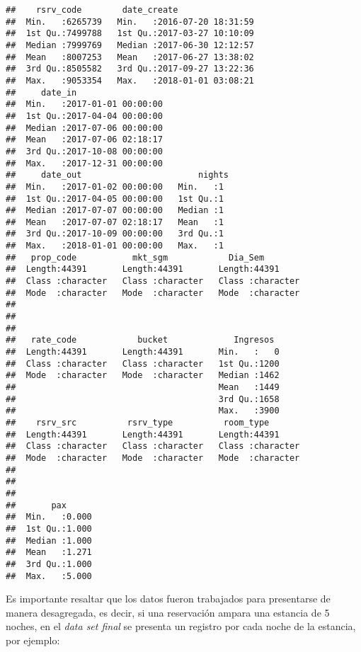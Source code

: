\begin{verbatim}
##    rsrv_code        date_create                 
##  Min.   :6265739   Min.   :2016-07-20 18:31:59  
##  1st Qu.:7499788   1st Qu.:2017-03-27 10:10:09  
##  Median :7999769   Median :2017-06-30 12:12:57  
##  Mean   :8007253   Mean   :2017-06-27 13:38:02  
##  3rd Qu.:8505582   3rd Qu.:2017-09-27 13:22:36  
##  Max.   :9053354   Max.   :2018-01-01 03:08:21  
##     date_in                   
##  Min.   :2017-01-01 00:00:00  
##  1st Qu.:2017-04-04 00:00:00  
##  Median :2017-07-06 00:00:00  
##  Mean   :2017-07-06 02:18:17  
##  3rd Qu.:2017-10-08 00:00:00  
##  Max.   :2017-12-31 00:00:00  
##     date_out                       nights 
##  Min.   :2017-01-02 00:00:00   Min.   :1  
##  1st Qu.:2017-04-05 00:00:00   1st Qu.:1  
##  Median :2017-07-07 00:00:00   Median :1  
##  Mean   :2017-07-07 02:18:17   Mean   :1  
##  3rd Qu.:2017-10-09 00:00:00   3rd Qu.:1  
##  Max.   :2018-01-01 00:00:00   Max.   :1  
##   prop_code           mkt_sgm            Dia_Sem         
##  Length:44391       Length:44391       Length:44391      
##  Class :character   Class :character   Class :character  
##  Mode  :character   Mode  :character   Mode  :character  
##                                                          
##                                                          
##                                                          
##   rate_code            bucket             Ingresos   
##  Length:44391       Length:44391       Min.   :   0  
##  Class :character   Class :character   1st Qu.:1200  
##  Mode  :character   Mode  :character   Median :1462  
##                                        Mean   :1449  
##                                        3rd Qu.:1658  
##                                        Max.   :3900  
##    rsrv_src          rsrv_type          room_type        
##  Length:44391       Length:44391       Length:44391      
##  Class :character   Class :character   Class :character  
##  Mode  :character   Mode  :character   Mode  :character  
##                                                          
##                                                          
##                                                          
##       pax       
##  Min.   :0.000  
##  1st Qu.:1.000  
##  Median :1.000  
##  Mean   :1.271  
##  3rd Qu.:1.000  
##  Max.   :5.000
\end{verbatim}

Es importante resaltar que los datos fueron trabajados para presentarse de manera desagregada, es decir, si una reservación ampara una estancia de 5 noches, en el \emph{data set final} se presenta un registro por cada noche de la estancia, por ejemplo:

